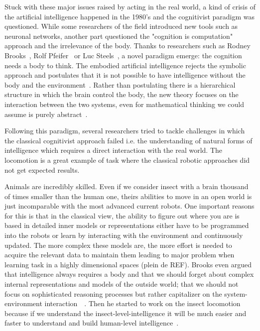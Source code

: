 Stuck with these major issues raised by acting in the real world, a kind of crisis of the artificial intelligence happened in the 1980's and the cognitivist paradigm was questioned. While some researchers of the field introduced new tools such as neuronal networks, another part questioned the "cognition is computation" approach and the irrelevance of the body.
Thanks to researchers such as Rodney Brooks~\cite{brooks1986achieving}, Rolf Pfeifer~\cite{pfeifer2001understanding} or Luc Steels~\cite{steels1995artificial}, a novel paradigm emerge: the cognition needs a body to think. The embodied artificial intelligence rejects the symbolic approach and postulates that it is not possible to have intelligence without the body and the environment~\cite{pfeifer2001understanding}. Rather than postulating there is a hierarchical structure in which the brain control the body, the new theory focuses on the interaction between the two systems, even for mathematical thinking we could assume is purely abstract~\cite{lakoff2000mathematics}.

Following this paradigm, several researchers tried to tackle challenges in which the classical cognitivist approach failed i.e. the understanding of natural forms of intelligence which requires a direct interaction with the real world. The locomotion is a great example of task where the classical robotic approaches did not get expected results.

Animals are incredibly skilled. Even if we consider insect with a brain thousand of times smaller than the human one, theirs abilities to move in an open world is just incomparable with the most advanced current robots. One important reasons for this is that in the classical view, the ability to figure out where you are is based in detailed inner models or representations either have to be programmed into the robots or learn by interacting with the environment and continuously updated. The more complex these models are, the more effort is needed to acquire the relevant data to maintain them leading to major problem when learning task in a highly dimensional spaces (plein de REF). Brooks even argued that intelligence always requires a body and that we should forget about complex internal representations and models of the outside world; that we should not focus on sophisticated reasoning processes but rather capitalizer on the system-environment interaction~\cite{brooks1991intelligence}~\cite{brooks1995intelligence}. Then he started to work on the insect locomotion because if we understand the insect-level-intelligence it will be much easier and faster to understand and build human-level intelligence~\cite{brooks1996prospects}.

